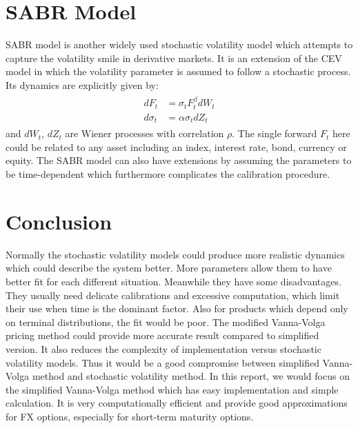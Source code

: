\section{SABR Model}
SABR model is another widely used stochastic volatility model which attempts to capture the volatility smile in derivative markets. It is an extension of the CEV model in which the volatility parameter is assumed to follow a stochastic process. Its dynamics are explicitly given by:
 \begin{align}
 \begin{aligned}
 dF_t &= \sigma_t F_t^\beta dW_t \\
 d\sigma_t &= \alpha \sigma_t dZ_t
 \end{aligned}
 \end{align}
and $dW_{t}$, $dZ_{t}$ are Wiener processes with correlation $\rho$.
\newline
The single forward $F_t$ here could be related to any asset including an index, interest rate, bond, currency or equity.
\newline\newline
The SABR model can also have extensions by assuming the parameters to be time-dependent which furthermore complicates the calibration procedure.

\section{Conclusion}
Normally the stochastic volatility models could produce more realistic dynamics which could describe the system better. More parameters allow them to have better fit for each different situation. Meanwhile they have some disadvantages. They usually need delicate calibrations and excessive computation, which limit their use when time is the dominant factor. Also for products which depend only on terminal distributions, the fit would be poor.
\newline
\newline
The modified Vanna-Volga pricing method could provide more accurate result compared to simplified version. It also reduces the complexity of implementation versus stochastic volatility models. Thus it would be a good compromise between simplified Vanna-Volga method and stochastic volatility method.
\newline
\newline
 In this report, we would focus on the simplified Vanna-Volga method which has easy implementation and simple calculation. It is very computationally efficient and provide good approximations for FX options, especially for short-term maturity options.
